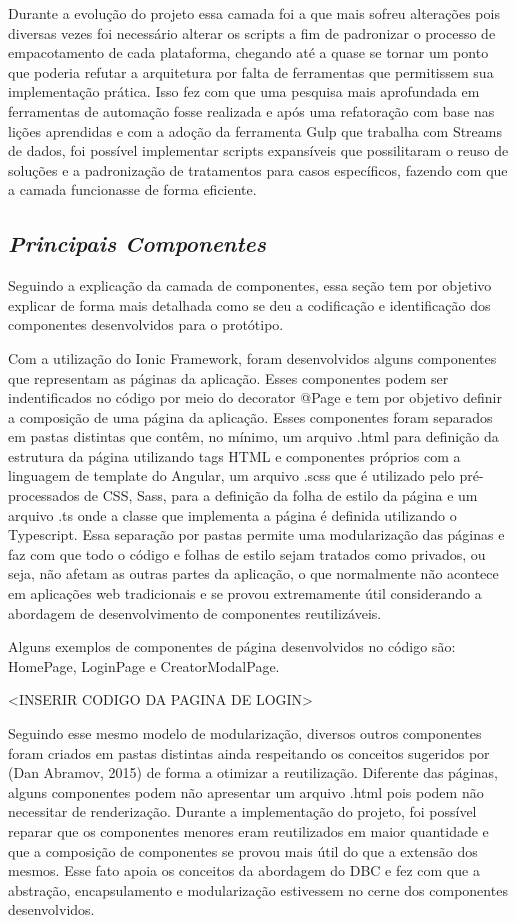 Durante a evolução do projeto essa camada foi a que mais sofreu alterações pois diversas vezes foi necessário alterar os scripts a fim de padronizar o processo de empacotamento de cada plataforma, chegando até a quase se tornar um ponto que poderia refutar a arquitetura por falta de ferramentas que permitissem sua implementação prática. Isso fez com que uma pesquisa mais aprofundada em ferramentas de automação fosse realizada e após uma refatoração com base nas lições aprendidas e com a adoção da ferramenta Gulp que trabalha com Streams de dados, foi possível implementar scripts expansíveis que possilitaram o reuso de soluções e a padronização de tratamentos para casos específicos, fazendo com que a camada funcionasse de forma eficiente.

\subsection{{\it Principais Componentes}}
Seguindo a explicação da camada de componentes, essa seção tem por objetivo explicar de forma mais detalhada como se deu a codificação e identificação dos componentes desenvolvidos para o protótipo.

Com a utilização do Ionic Framework, foram desenvolvidos alguns componentes que representam as páginas da aplicação. Esses componentes podem ser indentificados no código por meio do decorator @Page e tem por objetivo definir a composição de uma página da aplicação. Esses componentes foram separados em pastas distintas que contêm, no mínimo, um arquivo .html para definição da estrutura da página utilizando tags HTML e componentes próprios com a linguagem de template do Angular, um arquivo .scss que é utilizado pelo pré-processados de CSS, Sass, para a definição da folha de estilo da página e um arquivo .ts onde a classe que implementa a página é definida utilizando o Typescript. Essa separação por pastas permite uma modularização das páginas e faz com que todo o código e folhas de estilo sejam tratados como privados, ou seja, não afetam as outras partes da aplicação, o que normalmente não acontece em aplicações web tradicionais e se provou extremamente útil considerando a abordagem de desenvolvimento de componentes reutilizáveis.

Alguns exemplos de componentes de página desenvolvidos no código são: HomePage, LoginPage e CreatorModalPage.

<INSERIR CODIGO DA PAGINA DE LOGIN>

Seguindo esse mesmo modelo de modularização, diversos outros componentes foram criados em pastas distintas ainda respeitando os conceitos sugeridos por (Dan Abramov, 2015) de forma a otimizar a reutilização. Diferente das páginas, alguns componentes podem não apresentar um arquivo .html pois podem não necessitar de renderização. Durante a implementação do projeto, foi possível reparar que os componentes menores eram reutilizados em maior quantidade e que a composição de componentes se provou mais útil do que a extensão dos mesmos. Esse fato apoia os conceitos da abordagem do DBC e fez com que a abstração, encapsulamento e modularização estivessem no cerne dos componentes desenvolvidos.

